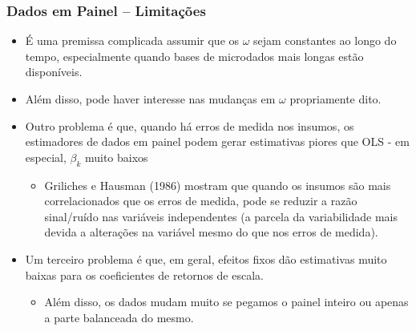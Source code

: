 \documentclass{beamer}
\begin{document}
\begin{frame}\frametitle{Dados em Painel -- Limitações}

\begin{itemize}
\item É uma premissa complicada assumir que os $\omega$ sejam constantes
ao longo do tempo, especialmente quando bases de microdados mais longas
estão disponíveis.
\item Além disso, pode haver interesse nas mudanças em $\omega$ propriamente
dito.
\item Outro problema é que, quando há erros de medida nos insumos, os estimadores
de dados em painel podem gerar estimativas piores que OLS - em especial,
$\beta_{k}$ muito baixos

\begin{itemize}
\item Griliches e Hausman (1986) mostram que quando os insumos são mais
correlacionados que os erros de medida, pode se reduzir a razão sinal/ruído
nas variáveis independentes (a parcela da variabilidade mais devida
a alterações na variável mesmo do que nos erros de medida).
\end{itemize}
\item Um terceiro problema é que, em geral, efeitos fixos dão estimativas
muito baixas para os coeficientes de retornos de escala.

\begin{itemize}
\item Além disso, os dados mudam muito se pegamos o painel inteiro ou apenas
a parte balanceada do mesmo.
\end{itemize}
\end{itemize}


\end{frame}
\end{document}

